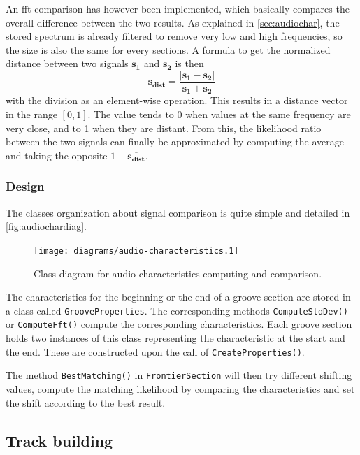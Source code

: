 An \gls{fft} comparison has however been implemented, which basically compares the overall difference between the two results. As explained in \autoref{sec:audiochar}, the stored spectrum is already filtered to remove very low and high frequencies, so the size is also the same for every sections. A formula to get the normalized distance between two signals $\mathbf{s_1}$ and $\mathbf{s_2}$ is then
\begin{equation}
\label{eq:fftcomp}
\mathbf{s_{dist}} = \frac{\left| \mathbf{s_1} - \mathbf{s_2} \right|}{\mathbf{s_1} + \mathbf{s_2}}
\end{equation}
with the division as an element-wise operation. This results in a distance vector in the range $[0,1]$. The value tends to 0 when values at the same frequency are very close, and to 1 when they are distant. From this, the likelihood ratio between the two signals can finally be approximated by computing the average and taking the opposite $1 - \overline{\mathbf{s_{dist}}}$.

\subsubsection{Design}

The classes organization about signal comparison is quite simple and detailed in \autoref{fig:audiochardiag}.

\begin{figure}[!ht]
\centering
\texttt{[image: diagrams/audio-characteristics.1]}
\caption{Class diagram for audio characteristics computing and comparison.}
\label{fig:audiochardiag}
\end{figure}

The characteristics for the beginning or the end of a groove section are stored in a class called \texttt{GrooveProperties}. The corresponding methods \texttt{ComputeStdDev()} or \texttt{ComputeFft()} compute the corresponding characteristics. Each groove section holds two instances of this class representing the characteristic at the start and the end. These are constructed upon the call of \texttt{CreateProperties()}.

The method \texttt{BestMatching()} in \texttt{FrontierSection} will then try different shifting values, compute the matching likelihood by comparing the characteristics and set the shift according to the best result.

\subsection{Track building}

